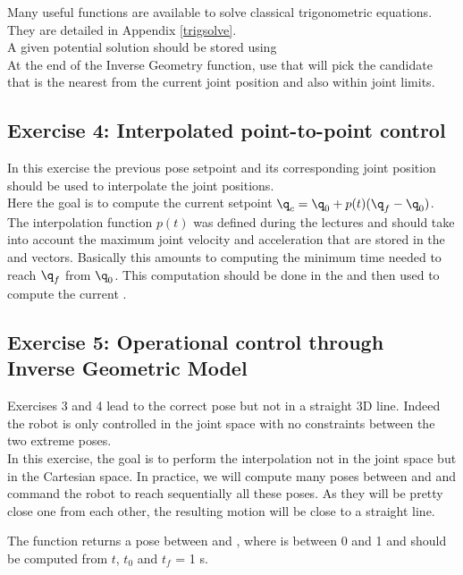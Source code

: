 \documentclass{ecnreport}
\begin{document}
  Many useful functions are available to solve classical trigonometric equations. They are detailed in Appendix \ref{trigsolve}.\\
  
  A given potential solution should be stored using \\ At the end of the Inverse Geometry function, use  that will pick the candidate that is the nearest from the current joint position and also within joint limits.
  
  \subsection*{Exercise 4: Interpolated point-to-point control}
  
  In this exercise the previous pose setpoint  and its corresponding joint position  should be used to interpolate the joint positions.\\
  
  Here the goal is to compute the current setpoint $\q_c = \q_0 + p(t)(\q_f-\q_0)$. The interpolation function $p(t)$ was defined during the lectures and should take into account the maximum joint velocity and acceleration that are stored in the  and  vectors. Basically this amounts to computing the minimum time  needed to reach $\q_f$ from $\q_0$. This computation should be done in the  and then used to compute the current .
  
  
  \subsection*{Exercise 5: Operational control through Inverse Geometric Model}
  
  Exercises 3 and 4 lead to the correct pose but not in a straight 3D line. Indeed the robot is only controlled in the joint space with no constraints between the two extreme poses.\\
  In this exercise, the goal is to perform the interpolation not in the joint space but in the Cartesian space. In practice, we will compute many poses between 
   and  and command the robot to reach sequentially all these poses. As they will be pretty close one from each other, the resulting motion
  will be close to a straight line.
  
  The  function returns a pose between  and , where  is between 0 and 1 and should be computed from $t$, $t_0$ and $t_f$ = 1 s.
  
\end{document}
